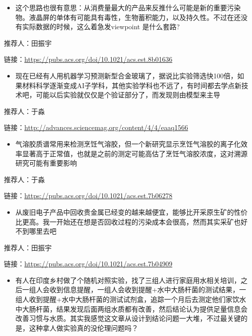 \documentclass[
]{book}
\providecommand{\tightlist}{%
  \setlength{\itemsep}{0pt}\setlength{\parskip}{0pt}}
\begin{document}
\begin{itemize}
\tightlist
\item
  这个思路也很有意思：从消费量最大的产品来反推什么可能是新的重要污染物。液晶屏的单体有可能具有毒性，生物蓄积能力，以及持久性。不过在还没有实际数据的时候，这么着急发viewpoint 是什么套路?
\end{itemize}

推荐人：田振宇

链接：\url{https://pubs.acs.org/doi/10.1021/acs.est.8b01636}

\begin{itemize}
\tightlist
\item
  现在已经有人用机器学习预测新型合金玻璃了，据说比实验筛选快100倍，如果材料科学逐渐变成AI子学科，其他实验学科也不远了，有时间都去学点新技术吧，可能以后实验就仅仅是个验证部分了，而发现则由模型来主导
\end{itemize}

推荐人：于淼

链接：\url{http://advances.sciencemag.org/content/4/4/eaaq1566}

\begin{itemize}
\tightlist
\item
  气溶胶质谱常用来检测烹饪气溶胶，但一个新研究显示烹饪气溶胶的离子化效率显著高于正常值，也就是之前的测定可能高估了烹饪气溶胶浓度，这对溯源研究可能有重要影响
\end{itemize}

推荐人：于淼

链接：\url{https://pubs.acs.org/doi/10.1021/acs.est.7b06278}

\begin{itemize}
\tightlist
\item
  从废旧电子产品中回收贵金属已经变的越来越便宜，能够比开采原生矿的性价比更高。我一开始还在想是否回收过程的污染成本会很高，然而其实采矿也好不到哪里去吧
\end{itemize}

推荐人：田振宇

链接：\url{https://pubs.acs.org/doi/10.1021/acs.est.7b04909}

\begin{itemize}
\tightlist
\item
  有人在印度乡村做了个随机对照实验，找了三组人进行家庭用水相关培训，之后一组人会收到信息提醒，一组人会收到提醒+水中大肠杆菌的测试结果，一组人收到提醒+水中大肠杆菌的测试试剂盒，追踪一个月后去测定他们家饮水中大肠杆菌，结果发现后面两组水质都有改善，然后结论认为提供足量信息会改善习惯与水质。其实我感觉这文章从设计到结论问题一大堆，不过最关键的是，这种拿人做实验真的没伦理问题吗？
\end{itemize}
\end{document}
